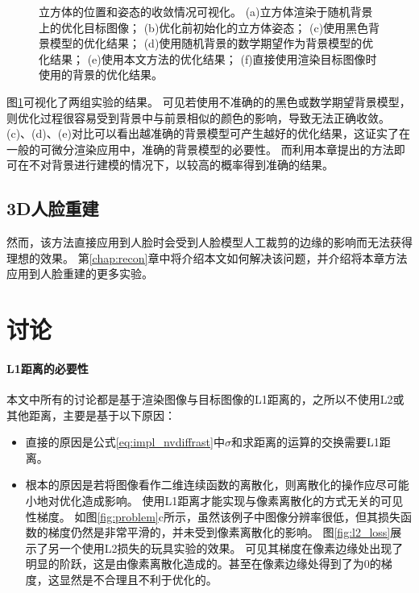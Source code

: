 \begin{figure}
    \caption[立方体的位置和姿态的收敛情况可视化]{
        立方体的位置和姿态的收敛情况可视化。
        (a)立方体渲染于随机背景上的优化目标图像；
        (b)优化前初始化的立方体姿态；
        (c)使用黑色背景模型的优化结果；
        (d)使用随机背景的数学期望作为背景模型的优化结果；
        (e)使用本文方法的优化结果；
        (f)直接使用渲染目标图像时使用的背景的优化结果。
    }
    \label{fig:cube_opt_vis}
\end{figure}
图\ref{fig:cube_opt_vis}可视化了两组实验的结果。
可见若使用不准确的的黑色或数学期望背景模型，则优化过程很容易受到背景中与前景相似的颜色的影响，导致无法正确收敛。
(c)、(d)、(e)对比可以看出越准确的背景模型可产生越好的优化结果，这证实了在一般的可微分渲染应用中，准确的背景模型的必要性。
而利用本章提出的方法即可在不对背景进行建模的情况下，以较高的概率得到准确的结果。

\subsection{3D人脸重建}


然而，该方法直接应用到人脸时会受到人脸模型人工裁剪的边缘的影响而无法获得理想的效果。
第\ref{chap:recon}章中将介绍本文如何解决该问题，并介绍将本章方法应用到人脸重建的更多实验。

\section{讨论}
\label{sec:method_discuss}

\paragraph{L1距离的必要性}
本文中所有的讨论都是基于渲染图像与目标图像的L1距离的，之所以不使用L2或其他距离，主要是基于以下原因：
\begin{itemize}
\item 直接的原因是公式\ref{eq:impl_nvdiffrast}中$\sigma$和求距离的运算的交换需要L1距离。
\item 根本的原因是若将图像看作二维连续函数的离散化，则离散化的操作应尽可能小地对优化造成影响。
使用L1距离才能实现与像素离散化的方式无关的可见性梯度。
如图\ref{fig:problem}c所示，虽然该例子中图像分辨率很低，但其损失函数的梯度仍然是非常平滑的，并未受到像素离散化的影响。
图\ref{fig:l2_loss}展示了另一个使用L2损失的玩具实验的效果。
可见其梯度在像素边缘处出现了明显的阶跃，这是由像素离散化造成的。甚至在像素边缘处得到了为0的梯度，这显然是不合理且不利于优化的。
\end{itemize}


